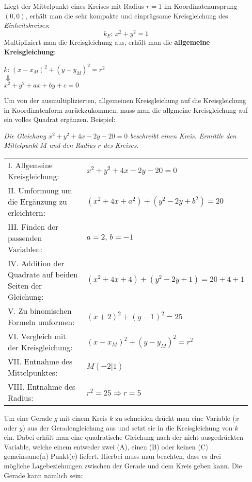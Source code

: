 Liegt der Mittelpunkt eines Kreises mit Radius $r = 1$ im Koordinatenursprung $(0, 0)$, erh\"{a}lt man die sehr kompakte und einpr\"{a}gsame Kreisgleichung des \emph{Einheitskreises}: $$k_{E}:\,x^2 + y^2 = 1$$ Multipliziert man die Kreisgleichung aus, erh\"{a}lt man die \textbf{allgemeine Kreisgleichung}:

\begin{center}
	$k:\, (x - x_{M})^2 + (y - y_{M})^2 = r^2$\\
	$\Downarrow$\\
	$x^2 + y^2 + ax + by + c = 0$
\end{center}

\pagebreak

Um von der ausmultiplizierten, allgemeinen Kreisgleichung auf die Kreisgleichung in Koordinatenform zur\"{u}ckzukommen, muss man die allgmeine Kreisgleichung auf ein volles Quadrat erg\"{a}nzen. Beispiel: \par

\emph{Die Gleichung $x^2 + y^2 + 4x - 2y - 20 = 0$ beschreibt einen Kreis. Ermittle den Mittelpunkt $M$ und den Radius $r$ des Kreises.}

\begin{tabular}{l l}
	I. Allgemeine Kreisgleichung: & $x^2 + y^2 + 4x - 2y - 20 = 0$
	\\
	II. Umformung um die Erg\"{a}nzung zu erleichtern: & $(x^2 + 4x + a^2) + (y^2 - 2y + b^2) = 20$
	\\
	III. Finden der passenden Variablen: & $a = 2,\, b = -1$
	\\
	IV. Addition der Quadrate auf beiden Seiten der Gleichung: & $(x^2 + 4x + 4) + (y^2 - 2y + 1) = 20 + 4 + 1$
	\\
	V. Zu binomischen Formeln umformen: & $(x + 2)^2 + (y - 1)^2 = 25$
	\\
	VI. Vergleich mit der Kreisgleichung: & $(x - x_{M})^2 + (y - y_{M})^2 = r^2$
	\\
	VII. Entnahme des Mittelpunktes: & $M (-2 | 1)$
	\\
	VIII. Entnahme des Radius: & $r^2 = 25 \Rightarrow r = 5$
\end{tabular}


Um eine Gerade $g$ mit einem Kreis $k$ zu schneiden dr\"{u}ckt man eine Variable ($x$ oder $y$) aus der Geradengleichung aus und setzt sie in die Kreisgleichung von $k$ ein. Dabei erh\"{a}lt man eine quadratische Gleichung nach der nicht ausgedr\"{u}ckten Variable, welche einem entweder zwei (A), einen (B) oder keinen (C) gemeinsame(n) Punkt(e) liefert. Hierbei muss man beachten, dass es drei m\"{o}gliche Lagebeziehungen zwischen der Gerade und dem Kreis geben kann. Die Gerade kann n\"{a}mlich sein:

